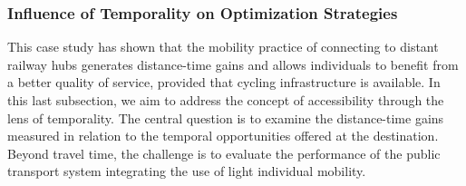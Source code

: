 \begin{refsegment}
\subsubsection*{Influence of Temporality on Optimization Strategies
    \label{chap5:temporalite}
    }

This case study has shown that the mobility practice of connecting to distant railway hubs generates distance-time gains and allows individuals to benefit from a better quality of service, provided that cycling infrastructure is available. In this last subsection, we aim to address the concept of accessibility through the lens of temporality. The central question is to examine the distance-time gains measured in relation to the temporal opportunities offered at the destination. Beyond travel time, the challenge is to evaluate the performance of the public transport system integrating the use of light individual mobility.%


\end{refsegment}

